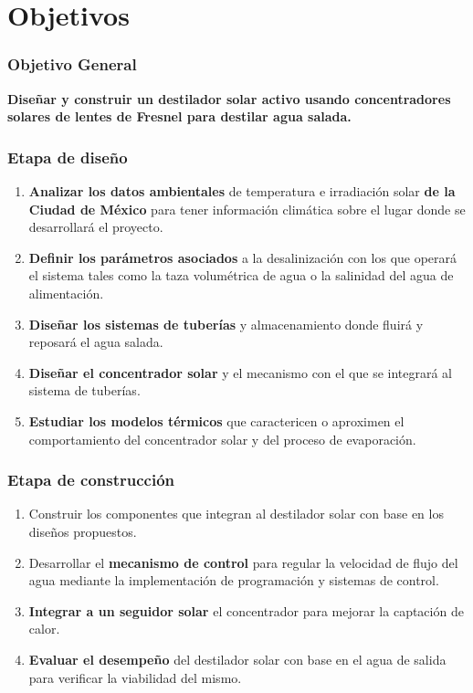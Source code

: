 \section{Objetivos}

\begin{frame}[allowframebreaks]
    \frametitle{Objetivo General}
    \begin{center}
    		\Large\bfseries \centering Diseñar y construir un destilador solar activo usando concentradores solares de lentes de Fresnel para destilar agua salada.
    \end{center}
\end{frame}

\begin{frame}
    \frametitle{Etapa de diseño}
    
    \begin{enumerate}[I]
    		\item \textbf{Analizar los datos ambientales} de temperatura e irradiación solar \textbf{de la Ciudad de México} para tener información climática sobre el lugar donde se desarrollará el proyecto.
    		\item \textbf{Definir los parámetros asociados} a la desalinización con los que operará el sistema tales como la taza volumétrica de agua o la salinidad del agua de alimentación.
        \item \textbf{Diseñar los sistemas de tuberías} y almacenamiento donde fluirá y reposará el agua salada.
        \item \textbf{Diseñar el concentrador solar} y el mecanismo con el que se integrará al sistema de tuberías.
        \item \textbf{Estudiar los modelos térmicos} que caractericen o aproximen el comportamiento del concentrador solar y del proceso de evaporación.
    \end{enumerate}
\end{frame}

\begin{frame}
	\frametitle{Etapa de construcción}
	
	\begin{enumerate}[I]
		\item Construir los componentes que integran al destilador solar con base en los diseños propuestos.
		\item Desarrollar el \textbf{mecanismo de control} para regular la velocidad de flujo del agua mediante la implementación de programación y sistemas de control.
		\item \textbf{Integrar a un seguidor solar} el concentrador para mejorar la captación de calor.
		\item \textbf{Evaluar el desempeño} del destilador solar con base en el agua de salida para verificar la viabilidad del mismo.
	\end{enumerate}
\end{frame}
